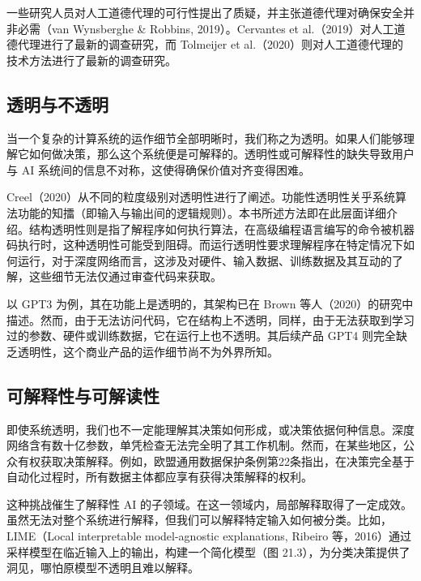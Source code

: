 一些研究人员对人工道德代理的可行性提出了质疑，并主张道德代理对确保安全并非必需（van Wynsberghe \& Robbins, 2019）。Cervantes et al.（2019）对人工道德代理进行了最新的调查研究，而 Tolmeijer et al.（2020）则对人工道德代理的技术方法进行了最新的调查研究。

\subsection{透明与不透明}
当一个复杂的计算系统的运作细节全部明晰时，我们称之为透明。如果人们能够理解它如何做决策，那么这个系统便是可解释的。透明性或可解释性的缺失导致用户与 AI 系统间的信息不对称，这使得确保价值对齐变得困难。

Creel（2020）从不同的粒度级别对透明性进行了阐述。功能性透明性关乎系统算法功能的知擂（即输入与输出间的逻辑规则）。本书所述方法即在此层面详细介绍。结构透明性则是指了解程序如何执行算法，在高级编程语言编写的命令被机器码执行时，这种透明性可能受到阻碍。而运行透明性要求理解程序在特定情况下如何运行，对于深度网络而言，这涉及对硬件、输入数据、训练数据及其互动的了解，这些细节无法仅通过审查代码来获取。

以 GPT3 为例，其在功能上是透明的，其架构已在 Brown 等人（2020）的研究中描述。然而，由于无法访问代码，它在结构上不透明，同样，由于无法获取到学习过的参数、硬件或训练数据，它在运行上也不透明。其后续产品 GPT4 则完全缺乏透明性，这个商业产品的运作细节尚不为外界所知。

\subsection{可解释性与可解读性}
即使系统透明，我们也不一定能理解其决策如何形成，或决策依据何种信息。深度网络含有数十亿参数，单凭检查无法完全明了其工作机制。然而，在某些地区，公众有权获取决策解释。例如，欧盟通用数据保护条例第22条指出，在决策完全基于自动化过程时，所有数据主体都应享有获得决策解释的权利。

这种挑战催生了解释性 AI 的子领域。在这一领域内，局部解释取得了一定成效。虽然无法对整个系统进行解释，但我们可以解释特定输入如何被分类。比如，LIME（Local interpretable model-agnostic explanations, Ribeiro 等，2016）通过采样模型在临近输入上的输出，构建一个简化模型（图 21.3），为分类决策提供了洞见，哪怕原模型不透明且难以解释。

